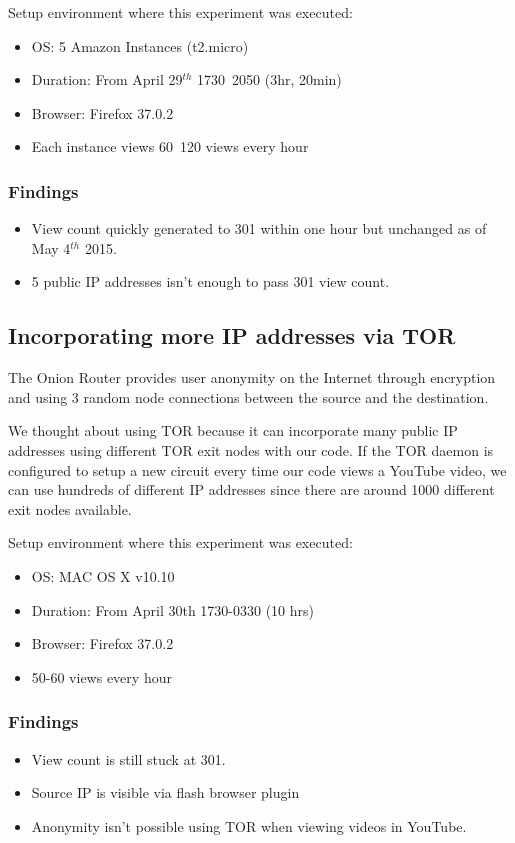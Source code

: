 \documentclass[conference]{IEEEtran}
\begin{document}
Setup environment where this experiment was executed:
\begin{itemize}
  \setlength\itemsep{-0.1em}
  \item OS: 5 Amazon Instances (t2.micro)
  \item Duration: From April 29$^{th}$ 1730~2050 (3hr, 20min)
  \item Browser: Firefox 37.0.2
  \item Each instance views 60~120 views every hour
\end{itemize}

\subsubsection*{Findings}
\begin{itemize}
  \setlength\itemsep{-0.1em}
  \item View count quickly generated to 301 within one hour but unchanged as of May 4$^{th}$ 2015.
  \item 5 public IP addresses isn’t enough to pass 301 view count.
\end{itemize}


\subsection{Incorporating more IP addresses via TOR}

The Onion Router provides user anonymity on the Internet through encryption and using 3 random node connections between the source and the destination.

We thought about using TOR because it can incorporate many public IP addresses using different TOR exit nodes with our code. If the TOR daemon is configured to setup a new circuit every time our code views a YouTube video, we can use hundreds of different IP addresses since there are around 1000 different exit nodes available.

Setup environment where this experiment was executed:
\begin{itemize}
  \setlength\itemsep{-0.1em}
  \item OS: MAC OS X v10.10
  \item Duration: From April 30th 1730-0330 (10 hrs)
  \item Browser: Firefox 37.0.2
  \item 50-60 views every hour
\end{itemize}

\subsubsection*{Findings}
\begin{itemize}
  \setlength\itemsep{-0.1em}
  \item View count is still stuck at 301.
  \item Source IP is visible via flash browser plugin
  \item Anonymity isn’t possible using TOR when viewing videos in YouTube.
\end{itemize}
\end{document}
